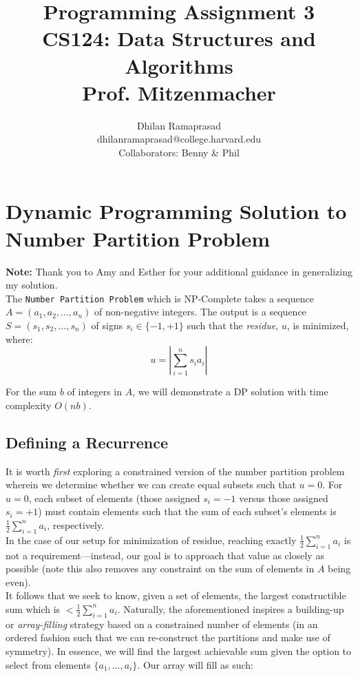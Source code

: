 \documentclass[conference]{styles/acmsiggraph}
\title{\huge Programming Assignment 3 \\ \LARGE {CS124: Data Structures and Algorithms \\ Prof. Mitzenmacher}}
\author{\Large Dhilan Ramaprasad \\
dhilanramaprasad@college.harvard.edu \\
Collaborators: Benny \& Phil}
\newcommand{\?}{\stackrel{?}{=}}
\begin{document}
\maketitle

\section{Dynamic Programming Solution to Number Partition Problem} \label{section:DP}
\textbf{Note:} Thank you to Amy and Esther for your additional guidance in generalizing my solution. \\

The \verb|Number Partition Problem| which is NP-Complete takes a sequence $A = (a_1, a_2, \ldots, a_n)$ of non-negative integers.  The output is a sequence $S = (s_1, s_2, \ldots, s_n)$ of signs $s_i \in \{-1, +1\}$ such that the \textit{residue}, $u$, is minimized, where:
$$u = \left | \sum_{i=1}^{n}s_i a_i \right |$$

For the sum $b$ of integers in $A$, we will demonstrate a DP solution with time complexity $O(nb)$.

\subsection{Defining a Recurrence}
It is worth \textit{first} exploring a constrained version of the number partition problem wherein we determine whether we can create equal subsets such that $u = 0$.  For $u = 0$, each subset of elements (those assigned $s_i = -1$ versus those assigned $s_i = +1$) must contain elements such that the sum of each subset's elements is $\frac{1}{2}\sum_{i=1}^{n}a_i$, respectively.\\

In the case of our setup for minimization of residue, reaching exactly $\frac{1}{2}\sum_{i=1}^{n}a_i$ is not a requirement---instead, our goal is to approach that value as closely as possible (note this also removes any constraint on the sum of elements in $A$ being even).\\

It follows that we seek to know, given a set of elements, the largest constructible sum which is $< \frac{1}{2}\sum_{i=1}^{n}a_i$.  Naturally, the aforementioned inspires a building-up or \textit{array-filling} strategy based on a constrained number of elements (in an ordered fashion such that we can re-construct the partitions and make use of symmetry).  In essence, we will find the largest achievable sum given the option to select from elements $\{a_1, \ldots, a_i\}$.  Our array will fill as such: \\
\end{document}
